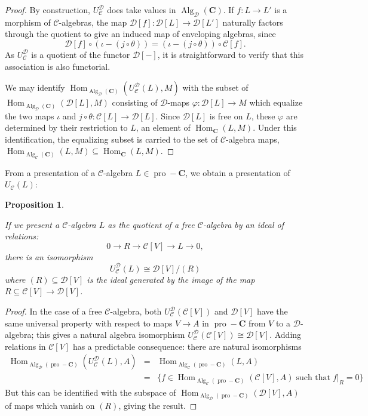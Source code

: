 \documentclass[12pt]{article}
\DeclareMathOperator{\Alg}{Alg}
\DeclareMathOperator{\Hom}{Hom}
\DeclareMathOperator{\pro}{pro}
\newcommand{\CC} {\mathcal{C}}
\newcommand{\DD} {\mathcal{D}}
\newcommand{\bC} {\mathbf{C}}
\newcommand{\proC}{\pro\!-\bC}
\theoremstyle{plain}
\newtheorem{prop}[thm]{Proposition}
\theoremstyle{definition}
\theoremstyle{remark}
\begin{document}
\begin{proof}

By construction, $U_{\CC}^{\DD}$ does take values in $\Alg_{\DD}(\bC)$.  If $f: L \to L'$ is a morphism of $\CC$-algebras, the map $\DD[f]: \DD[L] \to \DD[L']$ naturally factors through the quotient to give an induced map of enveloping algebras, since
%
$$\DD[f] \circ(\iota - (j \circ \theta)) = (\iota - (j \circ \theta)) \circ \CC[f].$$
%
As $U_{\CC}^{\DD}$ is a quotient of the functor $\DD[-]$, it is straightforward to verify that this association is also functorial.

We may identify $\Hom_{\Alg_{\DD}(\bC)}(U_{\CC}^{\DD}(L), M)$ with the subset of $\Hom_{\Alg_{\DD}(\bC)}(\DD[L], M)$ consisting of $\DD$-maps $\varphi: \DD[L] \to M$ which equalize the two maps $\iota$ and $j \circ \theta: \CC[L] \to \DD[L]$.  Since $\DD[L]$ is free on $L$, these $\varphi$ are determined by their restriction to $L$, an element of $\Hom_{\bC}(L, M)$.  Under this identification, the equalizing subset is carried to the set of $\CC$-algebra maps, $\Hom_{\Alg_{\CC}(\bC)}(L, M) \subseteq \Hom_{\bC}(L, M)$.

\end{proof}

From a presentation of a $\CC$-algebra $L \in \proC$, we obtain a presentation of $U_{\CC}(L)$:

\begin{prop} \label{gen_rel_cor} 

If we present a $\CC$-algebra $L$ as the quotient of a free $\CC$-algebra by an ideal of relations:
%
$$0 \to R \to \CC[V] \to L \to 0,$$
%
there is an isomorphism
%
$$U^{\DD}_{\CC}(L) \cong \DD[V]/(R)$$
%
where $(R) \subseteq \DD[V]$ is the ideal generated by the image of the map $R \subseteq \CC[V] \to \DD[V]$.  

\end{prop}

\begin{proof}

In the case of a free $\CC$-algebra, both $U_{\CC}^{\DD}(\CC[V])$ and $\DD[V]$ have the same universal property with respect to maps $V \to A$ in $\proC$ from $V$ to a $\DD$-algebra; this gives a natural algebra isomorphism $U_{\CC}^{\DD}(\CC[V]) \cong \DD[V]$.  Adding relations in $\CC[V]$ has a predictable consequence: there are natural isomorphisms
%
\begin{eqnarray*}
\Hom_{\Alg_{\DD}(\proC)}(U_{\CC}^{\DD}(L), A) & = & \Hom_{\Alg_{\CC}(\proC)}(L, A) \\
 & = & \{f \in \Hom_{\Alg_{\CC}(\proC)}(\CC[V], A) \; \mbox{such that} \; f|_R = 0\}
\end{eqnarray*}
%
But this can be identified with the subspace of $\Hom_{\Alg_{\DD}(\proC)}(\DD[V], A)$ of maps which vanish on $(R)$, giving the result.  

\end{proof}
\end{document}
